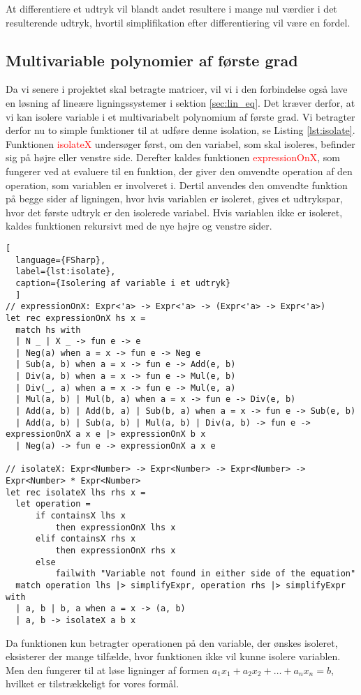 At differentiere et udtryk vil blandt andet resultere i mange nul værdier i det resulterende udtryk, hvortil simplifikation efter differentiering vil være en fordel.


\subsection{Multivariable polynomier af første grad}
Da vi senere i projektet skal betragte matricer, vil vi i den forbindelse også lave en løsning af lineære ligningssystemer i sektion \ref{sec:lin_eq}. Det kræver derfor, at vi kan isolere variable i et multivariabelt polynomium af første grad. Vi betragter derfor nu to simple funktioner til at udføre denne isolation, se Listing \ref{lst:isolate}. Funktionen \textcolor{red}{isolateX} undersøger først, om den variabel, som skal isoleres, befinder sig på højre eller venstre side. Derefter kaldes funktionen \textcolor{red}{expressionOnX}, som fungerer ved at evaluere til en funktion, der giver den omvendte operation af den operation, som variablen er involveret i. Dertil anvendes den omvendte funktion på begge sider af ligningen, hvor hvis variablen er isoleret, gives et udtrykspar, hvor det første udtryk er den isolerede variabel. Hvis variablen ikke er isoleret, kaldes funktionen rekursivt med de nye højre og venstre sider.

\begin{lstlisting}[
  language={FSharp}, 
  label={lst:isolate}, 
  caption={Isolering af variable i et udtryk}
  ]
// expressionOnX: Expr<'a> -> Expr<'a> -> (Expr<'a> -> Expr<'a>)
let rec expressionOnX hs x =
  match hs with
  | N _ | X _ -> fun e -> e
  | Neg(a) when a = x -> fun e -> Neg e
  | Sub(a, b) when a = x -> fun e -> Add(e, b)
  | Div(a, b) when a = x -> fun e -> Mul(e, b)
  | Div(_, a) when a = x -> fun e -> Mul(e, a)
  | Mul(a, b) | Mul(b, a) when a = x -> fun e -> Div(e, b)
  | Add(a, b) | Add(b, a) | Sub(b, a) when a = x -> fun e -> Sub(e, b)
  | Add(a, b) | Sub(a, b) | Mul(a, b) | Div(a, b) -> fun e -> expressionOnX a x e |> expressionOnX b x 
  | Neg(a) -> fun e -> expressionOnX a x e

// isolateX: Expr<Number> -> Expr<Number> -> Expr<Number> -> Expr<Number> * Expr<Number> 
let rec isolateX lhs rhs x =
  let operation = 
      if containsX lhs x 
          then expressionOnX lhs x
      elif containsX rhs x 
          then expressionOnX rhs x
      else 
          failwith "Variable not found in either side of the equation"
  match operation lhs |> simplifyExpr, operation rhs |> simplifyExpr with
  | a, b | b, a when a = x -> (a, b)
  | a, b -> isolateX a b x
\end{lstlisting}

Da funktionen kun betragter operationen på den variable, der ønskes isoleret, eksisterer der mange tilfælde, hvor funktionen ikke vil kunne isolere variablen. Men den fungerer til at løse ligninger af formen \(a_1x_1 + a_2x_2 + \ldots + a_nx_n = b\), hvilket er tilstrækkeligt for vores formål.
